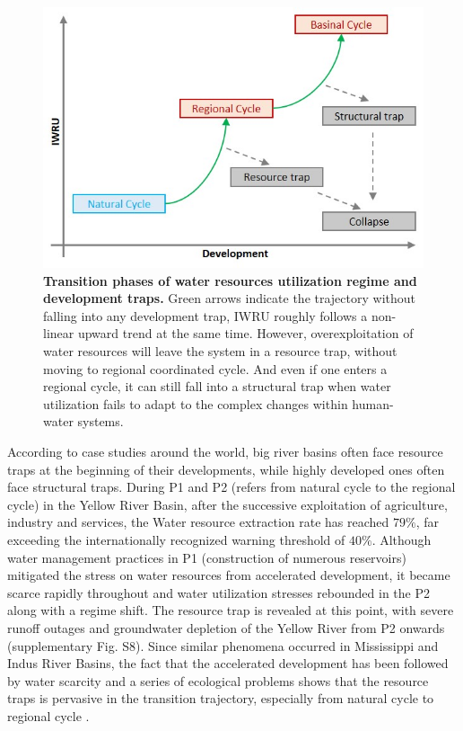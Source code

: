 \documentclass[9pt, twocolumn, twoside, lineno]{pnas-new}
\begin{document}
\begin{figure}%
	\centering
	\includegraphics[width=\linewidth]{../../figures/main/traps.jpg}
	\caption{
		\textbf{Transition phases of water resources utilization regime and development traps.}
		Green arrows indicate the trajectory without falling into any development trap, IWRU roughly follows a non-linear upward trend at the same time. However, overexploitation of water resources will leave the system in a resource trap, without moving to regional coordinated cycle. And even if one enters a regional cycle, it can still fall into a structural trap when water utilization fails to adapt to the complex changes within human-water systems.
	}
	\label{fig:traps}
\end{figure}

According to case studies around the world, big river basins often face resource traps at the beginning of their developments, while highly developed ones often face structural traps.
During P1 and P2 (refers from natural cycle to the regional cycle) in the Yellow River Basin, after the successive exploitation of agriculture, industry and services, the Water resource extraction rate has reached $79\%$, far exceeding the internationally recognized warning threshold of $40\%$. Although water management practices in P1 (construction of numerous reservoirs) mitigated the stress on water resources from accelerated development, it became scarce rapidly throughout and water utilization stresses rebounded in the P2 along with a regime shift. The resource trap is revealed at this point, with severe runoff outages and groundwater depletion of the Yellow River from P2 onwards (supplementary Fig. S8).
Since similar phenomena occurred in Mississippi and Indus River Basins, the fact that the accelerated development has been followed by water scarcity and a series of ecological problems shows that the resource traps is pervasive in the transition trajectory, especially from natural cycle to regional cycle 
\cite{bestAnthropogenicStressesWorld2019,cummingResilienceBigRiver2011}.
\end{document}
